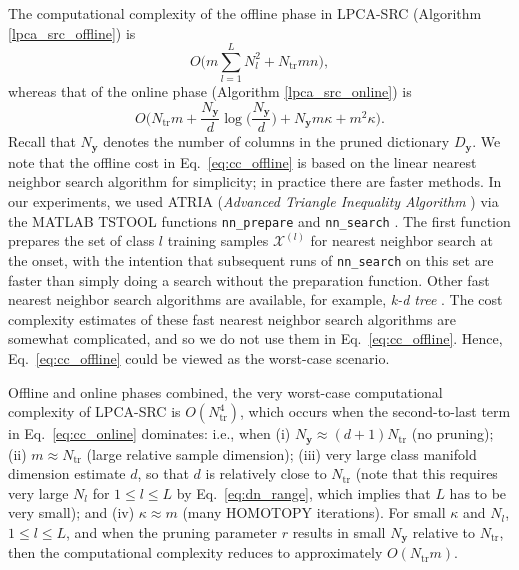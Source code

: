 \documentclass[review]{elsarticle}
\begin{document}
The computational complexity of the offline phase in LPCA-SRC (Algorithm \ref{lpca_src_offline}) is
\begin{equation} \label{eq:cc_offline}
O\Big(m\sum\limits_{l=1}^L N_l^2  + N_\mathrm{tr} mn\Big),
\end{equation}
whereas that of the online phase (Algorithm \ref{lpca_src_online}) is
\begin{equation} \label{eq:cc_online}
O\Big(N_\mathrm{tr} m + \frac{N_{\bm{y}}}{d} \log\Big(\frac{N_{\bm{y}}}{d}\Big)  + N_{\bm{y}}m\kappa + m^2\kappa  \Big).
\end{equation}
Recall that $N_{\bm{y}}$ denotes the number of columns in the pruned dictionary $D_{\bm{y}}$. We note that the offline cost in Eq.~\eqref{eq:cc_offline} is based on the linear nearest neighbor search algorithm for simplicity; in practice there are faster methods. In our experiments, we used ATRIA (\emph{Advanced Triangle Inequality Algorithm} \cite{merk:knn}) via the MATLAB TSTOOL functions \texttt{nn\_prepare} and \texttt{nn\_search} \cite{merk:tstool}. The first function prepares the set of class $l$ training samples $\mathcal{X}^{(l)}$ for nearest neighbor search at the onset, with the intention that subsequent runs of \texttt{nn\_search} on this set are faster than simply doing a search without the preparation function. Other fast nearest neighbor search algorithms are available, for example, \emph{k-d tree} \cite{ben:kdtree}. The cost complexity estimates of these fast nearest neighbor search algorithms are somewhat complicated, and so we do not use them in Eq.~\eqref{eq:cc_offline}. Hence, Eq.~\eqref{eq:cc_offline} could be viewed as the worst-case scenario.

Offline and online phases combined, the very worst-case computational complexity of LPCA-SRC is $O(N_\mathrm{tr}^4)$, which occurs when the second-to-last term in Eq.~\eqref{eq:cc_online} dominates: i.e., when (i) $N_{\bm{y}} \approx (d+1) N_\mathrm{tr}$ (no pruning); (ii) $m \approx N_\mathrm{tr}$ (large relative sample dimension); (iii) very large class manifold dimension estimate $d$, so that $d$ is relatively close to $N_\mathrm{tr}$ (note that this requires very large $N_l$ for $1\leq l \leq L$ by Eq.~\eqref{eq:dn_range}, which implies that $L$ has to be very small); and (iv) $\kappa \approx m$ (many HOMOTOPY iterations). For small $\kappa$ and $N_l$, $1\leq l\leq L$, and when the pruning parameter $r$ results in small $N_{\bm{y}}$ relative to $N_\mathrm{tr}$, then the computational complexity reduces to approximately $O(N_\mathrm{tr}m)$. 
\end{document}
